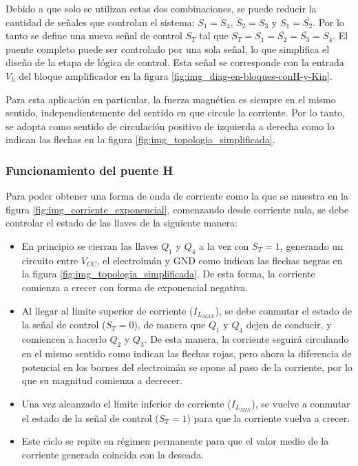 Debido a que solo se utilizan estas dos combinaciones, se puede reducir la cantidad de señales que controlan el sistema: $S_1=S_4$, $S_2=S_3$ y $S_1=\overline{S_2}$. Por lo tanto se define una nueva señal de control $S_T$ tal que $S_T=S_1=\overline{S_2}=\overline{S_3}=S_4$. El puente completo puede ser controlado por una sola señal, lo que simplifica el diseño de la etapa de lógica de control. Esta señal se corresponde con la entrada $V_h$ del bloque amplificador en la figura \ref{fig:img_diag-en-bloques-conH-y-Kin}.

Para esta aplicación en particular, la fuerza magnética es siempre en el mismo sentido, independientemente del sentido en que circule la corriente. Por lo tanto, se adopta como sentido de circulación positivo de izquierda a derecha como lo indican las flechas en la figura \ref{fig:img_topologia_simplificada}. 



\subsubsection{Funcionamiento del puente H}

Para poder obtener una forma de onda de corriente como la que se muestra en la figura \ref{fig:img_corriente_exponencial}, comenzando desde corriente nula, se debe controlar el estado de las llaves de la siguiente manera:


\begin{itemize}
	\item En principio se cierran las llaves $Q_1$ y $Q_4$ a la vez con $S_T=1$, generando un circuito entre $V_{CC}$, el electroimán y GND como indican las flechas negras en la figura \ref{fig:img_topologia_simplificada}. De esta forma, la corriente comienza a crecer con forma de exponencial negativa.
	\item Al llegar al límite superior de corriente ($I_{L_{MAX}}$), se debe conmutar el estado de la señal de control ($S_T=0$), de manera que $Q_1$ y $Q_4$ dejen de conducir, y comiencen a hacerlo $Q_2$ y $Q_3$. De esta manera, la corriente seguirá circulando en el mismo sentido como indican las flechas rojas, pero ahora la diferencia de potencial en los bornes del electroimán se opone al paso de la corriente, por lo que su magnitud comienza a decrecer.
	\item Una vez alcanzado el límite inferior de corriente ($I_{L_{MIN}}$), se vuelve a conmutar el estado de la señal de control ($S_T=1$) para que la corriente vuelva a crecer.
	\item Este ciclo se repite en régimen permanente para que el valor medio de la corriente generada coincida con la deseada. 
\end{itemize}

